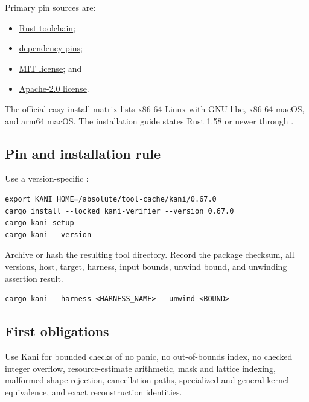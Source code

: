 \documentclass[11pt]{article}
\begin{document}
Primary pin sources are:
\begin{itemize}[leftmargin=*]
  \item
  \href{https://raw.githubusercontent.com/model-checking/kani/kani-0.67.0/rust-toolchain.toml}
  {Rust toolchain};
  \item
  \href{https://raw.githubusercontent.com/model-checking/kani/kani-0.67.0/kani-dependencies}
  {dependency pins};
  \item
  \href{https://raw.githubusercontent.com/model-checking/kani/kani-0.67.0/LICENSE-MIT}
  {MIT license}; and
  \item
  \href{https://raw.githubusercontent.com/model-checking/kani/kani-0.67.0/LICENSE-APACHE}
  {Apache-2.0 license}.
\end{itemize}

The official easy-install matrix lists x86-64 Linux with GNU libc, x86-64 macOS, and arm64 macOS.
The installation guide states Rust 1.58 or newer through .

\subsection{Pin and installation rule}

Use a version-specific :

\begin{lstlisting}
export KANI_HOME=/absolute/tool-cache/kani/0.67.0
cargo install --locked kani-verifier --version 0.67.0
cargo kani setup
cargo kani --version
\end{lstlisting}

Archive or hash the resulting tool directory.  Record the package checksum, all versions, host,
target, harness, input bounds, unwind bound, and unwinding assertion result.

\begin{lstlisting}
cargo kani --harness <HARNESS_NAME> --unwind <BOUND>
\end{lstlisting}

\subsection{First obligations}

Use Kani for bounded checks of no panic, no out-of-bounds index, no checked integer overflow,
resource-estimate arithmetic, mask and lattice indexing, malformed-shape rejection, cancellation
paths, specialized and general kernel equivalence, and exact reconstruction identities.
\end{document}
